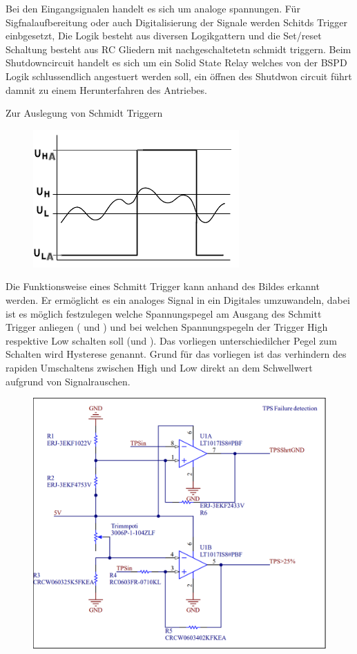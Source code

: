 Bei den Eingangsignalen handelt es sich um analoge spannungen. Für Sigfnalaufbereitung oder auch Digitalisierung der Signale werden Schitds Trigger einbgesetzt, Die Logik besteht aus diversen Logikgattern und die Set/reset Schaltung besteht aus RC Gliedern mit nachgeschaltetetn schmidt triggern. Beim Shutdowncircuit handelt es sich um ein Solid State Relay welches von der BSPD Logik schlussendlich angestuert werden soll, ein öffnen des Shutdwon circuit führt damnit zu einem Herunterfahren des Antriebes.

Zur Auslegung von Schmidt Triggern
\begin{figure}
	\centering
	\includegraphics[width=0.5\linewidth]{bilder/Schmitt-trigger-diagramm.png}
	\caption{}
	\label{fig:schmitt-trigger-diagramm}
\end{figure}

Die Funktionsweise eines Schmitt Trigger kann anhand des Bildes erkannt werden. Er ermöglicht es ein analoges Signal in ein Digitales umzuwandeln, dabei ist es möglich festzulegen welche Spannungspegel am Ausgang des Schmitt Trigger anliegen ( und ) und bei welchen Spannungspegeln der Trigger High respektive Low schalten soll (und ). Das vorliegen unterschiedilcher Pegel zum Schalten wird Hysterese genannt. Grund für das vorliegen ist das verhindern des rapiden Umschaltens zwischen High und Low direkt an dem Schwellwert aufgrund von Signalrauschen.

\begin{figure}
	\centering
	\includegraphics[width=0.7\linewidth]{"bilder/TPS Failure detection"}
	\caption{}
	\label{fig:tps-failure-detection}
\end{figure}

